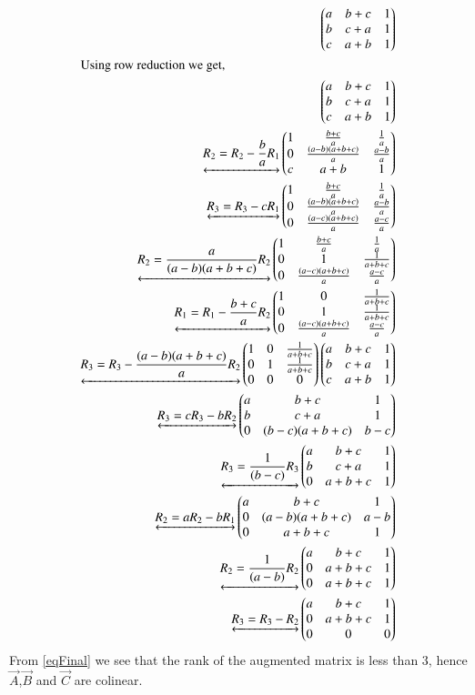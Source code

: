 \documentclass[journal,12pt,twocolumn]{IEEEtran}
\begin{document}
\begin{align}
\begin{pmatrix}a&b+c&1\\b&c+a&1\\c&a+b&1\end{pmatrix}\\
\intertext{Using row reduction we get,}
\begin{pmatrix}a&b+c&1\\b&c+a&1\\c&a+b&1\end{pmatrix}\\\underleftrightarrow{R_2=R_2-\frac{b}{a}R_1}\begin{pmatrix}1&\frac{b+c}{a}&\frac{1}{a}\\0&\frac{(a-b)(a+b+c)}{a}&\frac{a-b}{a}\\c&a+b&1\end{pmatrix}\\
\underleftrightarrow{R_3=R_3-cR_1}\begin{pmatrix}1&\frac{b+c}{a}&\frac{1}{a}\\0&\frac{(a-b)(a+b+c)}{a}&\frac{a-b}{a}\\0&\frac{(a-c)(a+b+c)}{a}&\frac{a-c}{a}\end{pmatrix}\\
\underleftrightarrow{R_2=\frac{a}{(a-b)(a+b+c)}R_2}\begin{pmatrix}1&\frac{b+c}{a}&\frac{1}{a}\\0&1&\frac{1}{a+b+c}\\0&\frac{(a-c)(a+b+c)}{a}&\frac{a-c}{a}\end{pmatrix}\\
\underleftrightarrow{R_1=R_1-\frac{b+c}{a}R_2}\begin{pmatrix}1&0&\frac{1}{a+b+c}\\0&1&\frac{1}{a+b+c}\\0&\frac{(a-c)(a+b+c)}{a}&\frac{a-c}{a}\end{pmatrix}\\
\underleftrightarrow{R_3=R_3-\frac{(a-b)(a+b+c)}{a}R_2}\begin{pmatrix}1&0&\frac{1}{a+b+c}\\0&1&\frac{1}{a+b+c}\\0&0&0\end{pmatrix}\label{eqFinal}
\begin{pmatrix}a&b+c&1\\b&c+a&1\\c&a+b&1\end{pmatrix}\\\underleftrightarrow{R_3=cR_3-bR_2}\begin{pmatrix}a&b+c&1\\b&c+a&1\\0&(b-c)(a+b+c)&b-c\end{pmatrix}\\
\underleftrightarrow{R_3=\frac{1}{(b-c)}R_3}\begin{pmatrix}a&b+c&1\\b&c+a&1\\0&a+b+c&1\end{pmatrix}\\
\underleftrightarrow{R_2=aR_2-bR_1}\begin{pmatrix}a&b+c&1\\0&(a-b)(a+b+c)&a-b\\0&a+b+c&1\end{pmatrix}\\
\underleftrightarrow{R_2=\frac{1}{(a-b)}R_2}\begin{pmatrix}a&b+c&1\\0&a+b+c&1\\0&a+b+c&1\end{pmatrix}\\
\underleftrightarrow{R_3=R_3-R_2}\begin{pmatrix}a&b+c&1\\0&a+b+c&1\\0&0&0\end{pmatrix}\\
\label{eqFinal}
\end{align}
From \eqref{eqFinal} we see that the rank of the augmented matrix is less than 3, hence $\vec{A}$,$\vec{B}$ and $\vec{C}$ are colinear.
\end{document}

